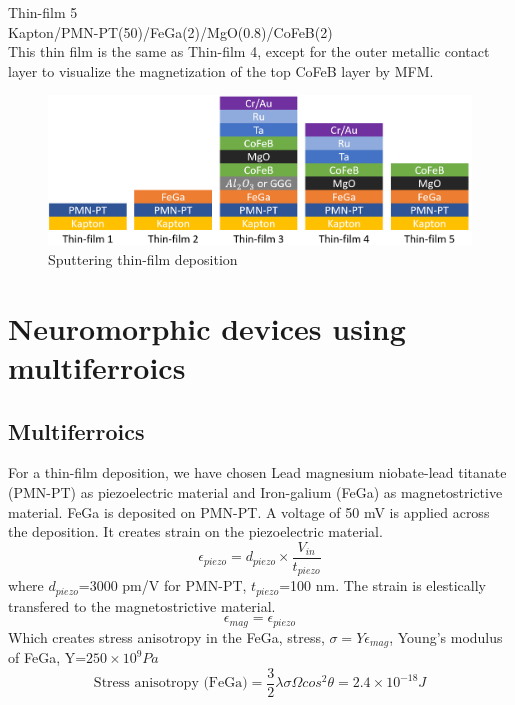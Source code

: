 \documentclass[12pt,a4paper,bold]{thesis}
\theoremstyle{thm}
\theoremstyle{definition}
\begin{document}
Thin-film 5\\
Kapton/PMN-PT(50)/FeGa(2)/MgO(0.8)/CoFeB(2)\\
This thin film is the same as Thin-film 4, except for the outer metallic contact layer to visualize the magnetization of the top CoFeB layer by MFM.
\begin{figure}[H]
	\centering
   \includegraphics[width=13cm]{Images/52.png} 
   \caption{Sputtering thin-film deposition}
\end{figure}
\section{Neuromorphic devices using multiferroics}
\subsection{Multiferroics}
For a thin-film deposition, we have chosen Lead magnesium niobate-lead titanate (PMN-PT) as piezoelectric material and Iron-galium (FeGa) as magnetostrictive material. FeGa is deposited on PMN-PT. A voltage of 50 mV is applied across the deposition. It creates strain on the piezoelectric material.
\[\epsilon_{piezo}=d_{piezo}\times \frac{V_{in}}{t_{piezo}}\]
where $d_{piezo}$=3000 pm/V for PMN-PT, $t_{piezo}$=100 nm.
The strain is elestically transfered to the magnetostrictive material. 
\[\epsilon_{mag}=\epsilon_{piezo}\] 
Which creates stress anisotropy in the FeGa, stress, $\sigma=Y\epsilon_{mag}$, Young's modulus of FeGa, Y=$250\times 10^9 Pa$
\[\text{Stress anisotropy (FeGa)}=\frac{3}{2}\lambda \sigma \Omega cos^2 \theta=2.4 \times 10^{-18} J\]
\end{document}
